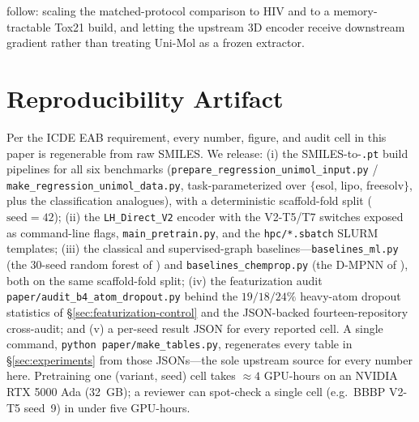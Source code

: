 \documentclass[sigconf,nonacm,anonymous,review]{acmart}
\begin{document}
follow: scaling the matched-protocol comparison to HIV and to a memory-tractable Tox21 build, and letting the upstream 3D encoder receive downstream gradient rather than treating Uni-Mol as a frozen extractor.

\section*{Reproducibility Artifact}
\label{sec:reproducibility}

Per the ICDE EAB requirement, every number, figure, and audit cell in this paper is regenerable from raw SMILES. We release: (i) the SMILES-to-\texttt{.pt} build pipelines for all six benchmarks (\texttt{prepare\_regression\_unimol\_input.py} / \texttt{make\_regression\_unimol\_data.py}, task-parameterized over $\{$esol, lipo, freesolv$\}$, plus the classification analogues), with a deterministic scaffold-fold split ($\mathrm{seed}{=}42$); (ii) the \texttt{LH\_Direct\_V2} encoder with the V2-T5/T7 switches exposed as command-line flags, \texttt{main\_pretrain.py}, and the \texttt{hpc/*.sbatch} SLURM templates; (iii) the classical and supervised-graph baselines---\texttt{baselines\_ml.py} (the 30-seed random forest of \citet{deng2023systematic}) and \texttt{baselines\_chemprop.py} (the D-MPNN of \citet{yang2019chemprop}), both on the same scaffold-fold split; (iv) the featurization audit \texttt{paper/audit\_b4\_atom\_dropout.py} behind the $19/18/24\%$ heavy-atom dropout statistics of \S\ref{sec:featurization-control} and the JSON-backed fourteen-repository cross-audit; and (v) a per-seed result JSON for every reported cell. A single command, \texttt{python paper/make\_tables.py}, regenerates every table in \S\ref{sec:experiments} from those JSONs---the sole upstream source for every number here. Pretraining one (variant, seed) cell takes $\approx 4$ GPU-hours on an NVIDIA RTX 5000 Ada (32~GB); a reviewer can spot-check a single cell (e.g.\ BBBP V2-T5 seed~9) in under five GPU-hours.

\end{document}
